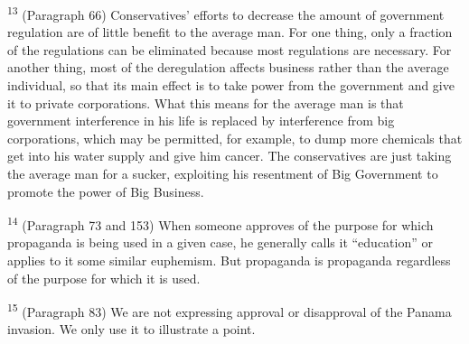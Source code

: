 \documentclass{article}
\begin{document}
\textsuperscript{13} (Paragraph 66) Conservatives’ efforts to decrease the amount of government regulation are of 
little benefit to the average man.  For one thing, only a fraction of the regulations can be 
eliminated because most regulations are necessary.  For another thing, most of the deregulation 
affects business rather than the average individual, so that its main effect is to take power from 
the government and give it to private corporations.  What this means for the average man is that 
government interference in his life is replaced by interference from big corporations, which may 
be permitted, for example, to dump more chemicals that get into his water supply and give him 
cancer.  The conservatives are just taking the average man for a sucker, exploiting his resentment 
of Big Government to promote the power of Big Business. \vspace{\baselineskip}

\textsuperscript{14} (Paragraph 73 and 153) When someone approves of the purpose for which propaganda is being 
used in a given case, he generally calls it “education” or applies to it some similar 
euphemism.  But propaganda is propaganda regardless of the purpose for which it is used. \vspace{\baselineskip}

\textsuperscript{15} (Paragraph 83) We are not expressing approval or disapproval of the Panama invasion.  We only 
use it to illustrate a point. \vspace{\baselineskip}
\end{document}
